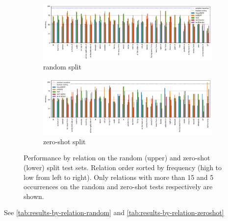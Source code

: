\begin{figure}[ht]
    \centering
\begin{subfigure}[b]{\linewidth}
    \centering
    \includegraphics[width=\linewidth]{images/visual-spatial-reasoning/performance_rel_random.png}
    \vspace{-1cm}
    \caption{random split}
\end{subfigure}
\begin{subfigure}[b]{\linewidth}
    \centering
    \includegraphics[width=\linewidth]{images/visual-spatial-reasoning/performance_rel_zeroshot.png}
    \vspace{-1cm}
    \caption{zero-shot split}
\end{subfigure}
\caption{Performance by relation on the random (upper) and zero-shot (lower) split test sets. Relation order sorted by frequency (high to low from left to right). Only relations with more than 15 and 5 occurrences on the random and zero-shot tests respectively are shown. }
    \label{fig:performance_by_rel}
\end{figure}

See \cref{tab:results-by-relation-random} and \cref{tab:results-by-relation-zeroshot}


